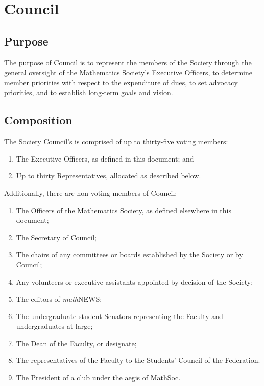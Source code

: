 \section{Council}

\subsection{Purpose}
The purpose of Council is to represent the members of the Society 
through the general oversight of the Mathematics Society’s Executive Officers,
to determine member priorities with respect to the expenditure of dues, 
to set advocacy priorities, and to establish long-term goals and vision.

\subsection{Composition}
The Society Council's is comprised of up to thirty-five voting members:
\begin{enumerate}
    \item The Executive Officers, as defined in this document; and
    \item Up to thirty Representatives, allocated as described below.
\end{enumerate}

\noindent Additionally, there are non-voting members of Council:
\begin{enumerate}
    \item The Officers of the Mathematics Society, as defined elsewhere in this
        document;
    \item The Secretary of Council;
    \item The chairs of any committees or boards established by the Society or by
        Council;
    \item Any volunteers or executive assistants appointed by decision of the
        Society;
    \item The editors of \emph{math}{\sf NEWS};
    \item The undergraduate student Senators representing the Faculty and
        undergraduates at-large;
    \item The Dean of the Faculty, or designate;
    \item The representatives of the Faculty to the Students' Council of the
        Federation.
    \item The President of a club under the aegis of MathSoc.
\end{enumerate}

